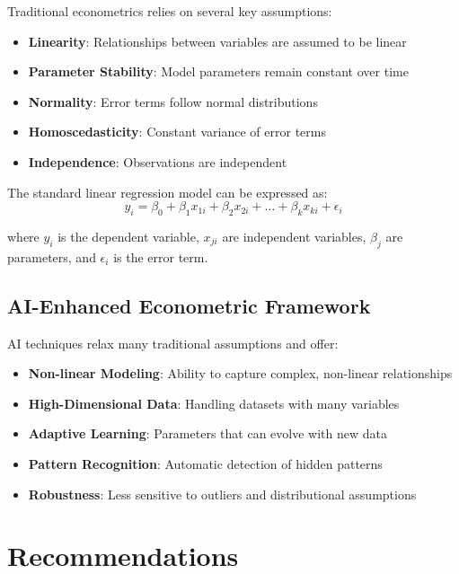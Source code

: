 \documentclass[12pt,a4paper]{article}
\begin{document}
Traditional econometrics relies on several key assumptions:

\begin{itemize}
    \item \textbf{Linearity}: Relationships between variables are assumed to be linear
    \item \textbf{Parameter Stability}: Model parameters remain constant over time
    \item \textbf{Normality}: Error terms follow normal distributions
    \item \textbf{Homoscedasticity}: Constant variance of error terms
    \item \textbf{Independence}: Observations are independent
\end{itemize}

The standard linear regression model can be expressed as:
\begin{equation}
y_i = \beta_0 + \beta_1 x_{1i} + \beta_2 x_{2i} + \ldots + \beta_k x_{ki} + \epsilon_i
\end{equation}

where $y_i$ is the dependent variable, $x_{ji}$ are independent variables, $\beta_j$ are parameters, and $\epsilon_i$ is the error term.

\subsection{AI-Enhanced Econometric Framework}

AI techniques relax many traditional assumptions and offer:

\begin{itemize}
    \item \textbf{Non-linear Modeling}: Ability to capture complex, non-linear relationships
    \item \textbf{High-Dimensional Data}: Handling datasets with many variables
    \item \textbf{Adaptive Learning}: Parameters that can evolve with new data
    \item \textbf{Pattern Recognition}: Automatic detection of hidden patterns
    \item \textbf{Robustness}: Less sensitive to outliers and distributional assumptions
\end{itemize}

 
\section{Recommendations}
\end{document}
